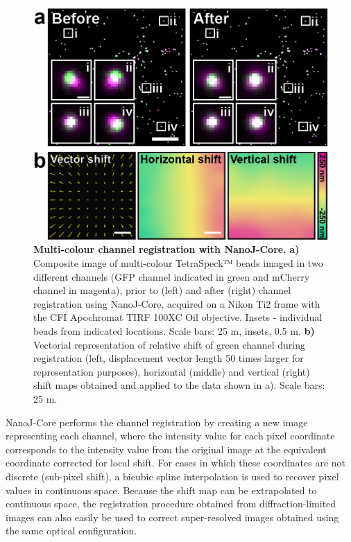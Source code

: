  \begin{figure}[!t]
    \centering
    \includegraphics{Figures/FigureChannelAlignment_v4.png}
    \caption{\textbf{Multi-colour channel registration with NanoJ-Core.} \textbf{a)} Composite image of multi-colour TetraSpeck™ beads imaged in two different channels (GFP channel indicated in green and mCherry channel in magenta), prior to (left) and after (right) channel registration using NanoJ-Core, acquired on a Nikon Ti2 frame with the CFI Apochromat TIRF 100XC Oil objective. Insets - individual beads from indicated locations. Scale bars: 25 \micro m, insets, 0.5 \micro m. \textbf{b)} Vectorial representation of relative shift of green channel during registration (left, displacement vector length 50 times larger for representation purposes), horizontal (middle) and vertical (right) shift maps obtained and applied to the data shown in a). Scale bars: 25 \micro m.}
    \label{fig:ChannelAlignment}
\end{figure}
 
 NanoJ-Core performs the channel registration by creating a new image representing each channel, where the intensity value for each pixel coordinate corresponds to the intensity value from the original image at the equivalent coordinate corrected for local shift. For cases in which these coordinates are not discrete (sub-pixel shift), a bicubic spline interpolation is used to recover pixel values in continuous space. Because the shift map can be extrapolated to continuous space, the registration procedure obtained from diffraction-limited images can also easily be used to correct super-resolved images obtained using the same optical configuration.
 
